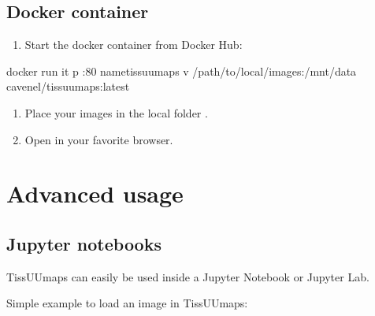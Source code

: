 \documentclass[letterpaper,10pt,english,openany,oneside]{sphinxmanual}
\begin{document}
\sphinxstepscope


\section{Docker container}
\label{\detokenize{docs/sharing/docker:docker-container}}\label{\detokenize{docs/sharing/docker::doc}}\begin{enumerate}
%
\item {} 
\sphinxAtStartPar
Start the docker container  from Docker Hub:

\end{enumerate}

\begin{sphinxVerbatim}[commandchars=\\\{\}]
docker run \PYGZhy{}it \PYGZhy{}p :80 \PYGZhy{}\PYGZhy{}nametissuumaps \PYGZhy{}v /path/to/local/images:/mnt/data cavenel/tissuumaps:latest
\end{sphinxVerbatim}
\begin{enumerate}
%
\item {} 
\sphinxAtStartPar
Place your images in the local folder .

\item {} 
\sphinxAtStartPar
Open  in your favorite browser.

\end{enumerate}

\sphinxstepscope


\chapter{Advanced usage}
\label{\detokenize{docs/advanced/index:advanced-usage}}\label{\detokenize{docs/advanced/index::doc}}
\sphinxstepscope


\section{Jupyter notebooks}
\label{\detokenize{docs/advanced/jupyter:jupyter-notebooks}}\label{\detokenize{docs/advanced/jupyter::doc}}
\sphinxAtStartPar
TissUUmaps can easily be used inside a Jupyter Notebook or Jupyter Lab.

\sphinxAtStartPar
Simple example to load an image in TissUUmaps:
\end{document}

